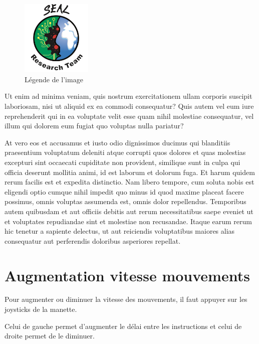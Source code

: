 \begin{figure}
\begin{center}
	\includegraphics[width=0.3\textwidth]{./img/logo_equipe_robotique_exploration}
	\caption{Légende de l'image}
	\label{fig:image1}
\end{center}
\end{figure}


Ut enim ad minima veniam, quis nostrum exercitationem ullam corporis suscipit laboriosam, nisi ut aliquid ex ea commodi consequatur? Quis autem vel eum iure reprehenderit qui in ea voluptate velit esse quam nihil molestiae consequatur, vel illum qui dolorem eum fugiat quo voluptas nulla pariatur?

At vero eos et accusamus et iusto odio dignissimos ducimus qui blanditiis praesentium voluptatum deleniti atque corrupti quos dolores et quas molestias excepturi sint occaecati cupiditate non provident, similique sunt in culpa qui officia deserunt mollitia animi, id est laborum et dolorum fuga. Et harum quidem rerum facilis est et expedita distinctio. Nam libero tempore, cum soluta nobis est eligendi optio cumque nihil impedit quo minus id quod maxime placeat facere possimus, omnis voluptas assumenda est, omnis dolor repellendus. Temporibus autem quibusdam et aut officiis debitis aut rerum necessitatibus saepe eveniet ut et voluptates repudiandae sint et molestiae non recusandae. Itaque earum rerum hic tenetur a sapiente delectus, ut aut reiciendis voluptatibus maiores alias consequatur aut perferendis doloribus asperiores repellat.
		
		\section{Augmentation vitesse mouvements}

Pour augmenter ou diminuer la vitesse des mouvements, il faut appuyer sur les joysticks de la manette.

Celui de gauche permet d'augmenter le délai entre les instructions et celui de droite permet de le diminuer.
		
